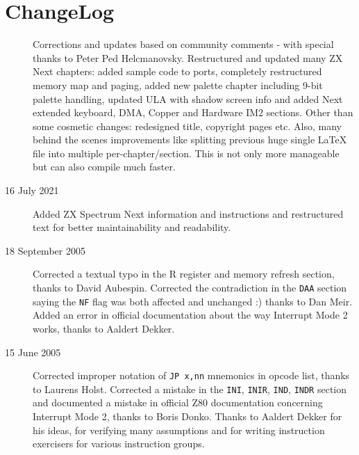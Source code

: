 \pagebreak
\section{ChangeLog}

\begin{description}


	\item[\LatestRevisionName]
	Corrections and updates based on community comments - with special thanks to Peter Ped Helcmanovsky. Restructured and updated many ZX Next chapters: added sample code to ports, completely restructured memory map and paging, added new palette chapter including 9-bit palette handling, updated ULA with shadow screen info and added Next extended keyboard, DMA, Copper and Hardware IM2 sections. Other than some cosmetic changes: redesigned title, copyright pages etc. Also, many behind the scenes improvements like splitting previous huge single \LaTeX~ file into multiple per-chapter/section. This is not only more manageable but can also compile much faster.

	\item[16 July 2021]
	Added ZX Spectrum Next information and instructions and restructured text for better maintainability and readability.

	\item[18 September 2005]
	Corrected a textual typo in the R register and memory refresh section, thanks to David Aubespin. Corrected the contradiction in the {\tt DAA} section saying the {\tt NF} flag was both affected and unchanged :) thanks to Dan Meir. Added an error in official documentation about the way Interrupt Mode 2 works, thanks to Aaldert Dekker.
	
	\item[15 June 2005]
	Corrected improper notation of {\tt JP x,nn} mnemonics in opcode list, thanks to Laurens Holst. Corrected a mistake in the {\tt INI}, {\tt INIR}, {\tt IND}, {\tt INDR} section and documented a mistake in official Z80 documentation concerning Interrupt Mode 2, thanks to Boris Donko. Thanks to Aaldert Dekker for his ideas, for verifying many assumptions and for writing instruction exercisers for various instruction groups.


\end{description}
